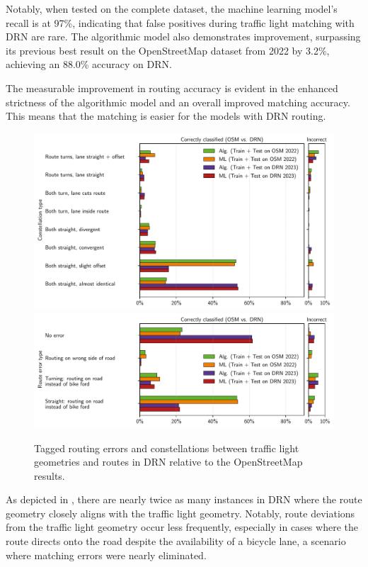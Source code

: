 Notably, when tested on the complete dataset, the machine learning model's recall is at 97\%, indicating that false positives during traffic light matching with DRN are rare. The algorithmic model also demonstrates improvement, surpassing its previous best result on the OpenStreetMap dataset from 2022 by 3.2\%, achieving an 88.0\% accuracy on DRN. 

The measurable improvement in routing accuracy is evident in the enhanced strictness of the algorithmic model and an overall improved matching accuracy. This means that the matching is easier for the models with DRN routing.

\begin{figure}[!t]
\centering 
\includegraphics[width=\linewidth]{images/matching-constellations-osm-vs-drn.pdf} \\
\includegraphics[width=\linewidth]{images/matching-route-errors-osm-vs-drn.pdf}
\caption{Tagged routing errors and constellations between traffic light geometries and routes in DRN relative to the OpenStreetMap results.}
\label{fig:matching-constellations-osm-vs-drn}
\end{figure}

As depicted in , there are nearly twice as many instances in DRN where the route geometry closely aligns with the traffic light geometry. Notably, route deviations from the traffic light geometry occur less frequently, especially in cases where the route directs onto the road despite the availability of a bicycle lane, a scenario where matching errors were nearly eliminated. 


